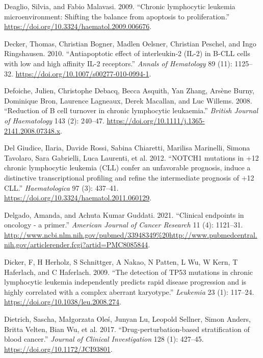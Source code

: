 \documentclass[11pt, a4paper, twosided]{book}
\newenvironment{CSLReferences}%
  {}%
  {\par}
\begin{document}
\begin{CSLReferences}{1}{0}
\leavevmode{}%
Deaglio, Silvia, and Fabio Malavasi. 2009. {``{Chronic lymphocytic leukemia microenvironment: Shifting the balance from apoptosis to proliferation}.''} \url{https://doi.org/10.3324/haematol.2009.006676}.

\leavevmode{}%
Decker, Thomas, Christian Bogner, Madlen Oelsner, Christian Peschel, and Ingo Ringshausen. 2010. {``{Antiapoptotic effect of interleukin-2 (IL-2) in B-CLL cells with low and high affinity IL-2 receptors}.''} \emph{Annals of Hematology} 89 (11): 1125--32. \url{https://doi.org/10.1007/s00277-010-0994-1}.

\leavevmode{}%
Defoiche, Julien, Christophe Debacq, Becca Asquith, Yan Zhang, Arsène Burny, Dominique Bron, Laurence Lagneaux, Derek Macallan, and Luc Willems. 2008. {``{Reduction of B cell turnover in chronic lymphocytic leukaemia}.''} \emph{British Journal of Haematology} 143 (2): 240--47. \url{https://doi.org/10.1111/j.1365-2141.2008.07348.x}.

\leavevmode{}%
Del Giudice, Ilaria, Davide Rossi, Sabina Chiaretti, Marilisa Marinelli, Simona Tavolaro, Sara Gabrielli, Luca Laurenti, et al. 2012. {``{NOTCH1 mutations in +12 chronic lymphocytic leukemia (CLL) confer an unfavorable prognosis, induce a distinctive transcriptional profiling and refine the intermediate prognosis of +12 CLL}.''} \emph{Haematologica} 97 (3): 437--41. \url{https://doi.org/10.3324/haematol.2011.060129}.

\leavevmode{}%
Delgado, Amanda, and Achuta Kumar Guddati. 2021. {``{Clinical endpoints in oncology - a primer.}''} \emph{American Journal of Cancer Research} 11 (4): 1121--31. \url{http://www.ncbi.nlm.nih.gov/pubmed/33948349\%20http://www.pubmedcentral.nih.gov/articlerender.fcgi?artid=PMC8085844}.

\leavevmode{}%
Dicker, F, H Herholz, S Schnittger, A Nakao, N Patten, L Wu, W Kern, T Haferlach, and C Haferlach. 2009. {``{The detection of TP53 mutations in chronic lymphocytic leukemia independently predicts rapid disease progression and is highly correlated with a complex aberrant karyotype.}''} \emph{Leukemia} 23 (1): 117--24. \url{https://doi.org/10.1038/leu.2008.274}.

\leavevmode{}%
Dietrich, Sascha, Małgorzata Oleś, Junyan Lu, Leopold Sellner, Simon Anders, Britta Velten, Bian Wu, et al. 2017. {``{Drug-perturbation-based stratification of blood cancer}.''} \emph{Journal of Clinical Investigation} 128 (1): 427--45. \url{https://doi.org/10.1172/JCI93801}.


\end{CSLReferences}
\end{document}
